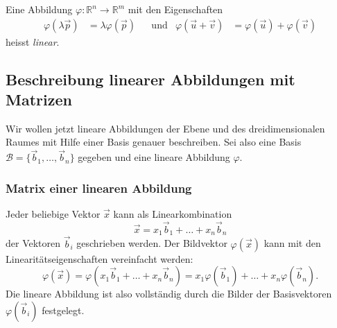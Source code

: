\begin{definition}
Eine Abbildung $\varphi\colon \mathbb R^n \to \mathbb R^m$ mit den
Eigenschaften
\[
\begin{aligned}
\varphi(\lambda\vec{p})&=\lambda\varphi(\vec{p})
&&\text{und}&
\varphi(\vec{u}+\vec{v})&=\varphi(\vec{u}) + \varphi(\vec{v})
\end{aligned}
\]
heisst {\em linear}.
\end{definition}

%
%
\subsection{Beschreibung linearer Abbildungen mit Matrizen}
Wir wollen jetzt lineare Abbildungen der Ebene und des dreidimensionalen
Raumes mit Hilfe einer Basis genauer beschreiben.
Sei also eine Basis $\mathcal{B}=\{\vec{b}_1,\dots,\vec{b}_n\}$ 
gegeben und eine lineare Abbildung $\varphi$.

\subsubsection{Matrix einer linearen Abbildung}
Jeder beliebige Vektor $\vec{x}$ kann als Linearkombination
\[
\vec{x}
=
x_1\vec{b}_1
+\dots+
x_n\vec{b}_n
\]
der Vektoren $\vec{b}_i$ geschrieben werden.
Der Bildvektor $\varphi(\vec{x})$ kann mit den Linearitätseigenschaften
vereinfacht werden:
\[
\varphi(\vec{x})
=
\varphi(
x_1\vec{b}_1
+\dots+
x_n\vec{b}_n
)
=
x_1\varphi(\vec{b}_1)
+\dots+
x_n\varphi(\vec{b}_n).
\]
Die lineare Abbildung ist also vollständig durch die Bilder der Basisvektoren
$\varphi(\vec{b}_i)$ festgelegt.

